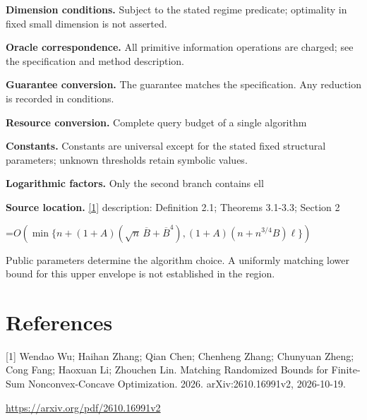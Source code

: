 \documentclass[10pt,a4paper]{article}
\newcommand{\AtlasMath}[1]{\par\begingroup\centering\setbox0=\hbox{$\displaystyle #1$}\ifdim\wd0>1.4\linewidth\typeout{ATLAS WIDE FORMULA: \the\wd0}\fi\ifdim\wd0>\linewidth\resizebox{\linewidth}{!}{\box0}\else\box0\fi\par\endgroup}
\begin{document}
\textbf{Dimension conditions.} Subject to the stated regime predicate; optimality in fixed small dimension is not asserted.

\textbf{Oracle correspondence.} All primitive information operations are charged; see the specification and method description.

\textbf{Guarantee conversion.} The guarantee matches the specification. Any reduction is recorded in conditions.

\textbf{Resource conversion.} Complete query budget of a single algorithm

\textbf{Constants.} Constants are universal except for the stated fixed structural parameters; unknown thresholds retain symbolic values.

\textbf{Logarithmic factors.} Only the second branch contains ell

\textbf{Source location.} \href{https://arxiv.org/pdf/2610.16991v2}{[1]} description: Definition 2.1; Theorems 3.1-3.3; Section 2

\AtlasMath{O\!\left(\min\{n+(1+A)(\sqrt n\,\overline B+\overline B^4),(1+A)(n+n^{3/4}B)\ell\}\right)}
Public parameters determine the algorithm choice. A uniformly matching lower bound for this upper envelope is not established in the region.

\section{References}
[1] Wendao Wu; Haihan Zhang; Qian Chen; Chenheng Zhang; Chunyuan Zheng; Cong Fang; Haoxuan Li; Zhouchen Lin. Matching Randomized Bounds for Finite-Sum Nonconvex-Concave Optimization. 2026. arXiv:2610.16991v2, 2026-10-19.

\url{https://arxiv.org/pdf/2610.16991v2}
\end{document}
